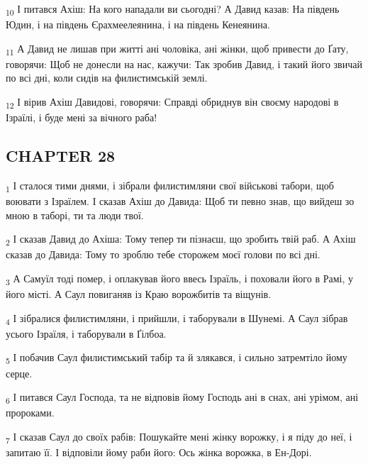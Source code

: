 \begin{tcolorbox}
\textsubscript{10} І питався Ахіш: На кого нападали ви сьогодні? А Давид казав: На південь Юдин, і на південь Єрахмеелеянина, і на південь Кенеянина.
\end{tcolorbox}
\begin{tcolorbox}
\textsubscript{11} А Давид не лишав при житті ані чоловіка, ані жінки, щоб привести до Ґату, говорячи: Щоб не донесли на нас, кажучи: Так зробив Давид, і такий його звичай по всі дні, коли сидів на филистимській землі.
\end{tcolorbox}
\begin{tcolorbox}
\textsubscript{12} І вірив Ахіш Давидові, говорячи: Справді обриднув він своєму народові в Ізраїлі, і буде мені за вічного раба!
\end{tcolorbox}
\subsection{CHAPTER 28}
\begin{tcolorbox}
\textsubscript{1} І сталося тими днями, і зібрали филистимляни свої військові табори, щоб воювати з Ізраїлем. І сказав Ахіш до Давида: Щоб ти певно знав, що вийдеш зо мною в таборі, ти та люди твої.
\end{tcolorbox}
\begin{tcolorbox}
\textsubscript{2} І сказав Давид до Ахіша: Тому тепер ти пізнаєш, що зробить твій раб. А Ахіш сказав до Давида: Тому то зроблю тебе сторожем моєї голови по всі дні.
\end{tcolorbox}
\begin{tcolorbox}
\textsubscript{3} А Самуїл тоді помер, і оплакував його ввесь Ізраїль, і поховали його в Рамі, у його місті. А Саул повиганяв із Краю ворожбитів та віщунів.
\end{tcolorbox}
\begin{tcolorbox}
\textsubscript{4} І зібралися филистимляни, і прийшли, і таборували в Шунемі. А Саул зібрав усього Ізраїля, і таборували в Ґілбоа.
\end{tcolorbox}
\begin{tcolorbox}
\textsubscript{5} І побачив Саул филистимський табір та й злякався, і сильно затремтіло йому серце.
\end{tcolorbox}
\begin{tcolorbox}
\textsubscript{6} І питався Саул Господа, та не відповів йому Господь ані в снах, ані урімом, ані пророками.
\end{tcolorbox}
\begin{tcolorbox}
\textsubscript{7} І сказав Саул до своїх рабів: Пошукайте мені жінку ворожку, і я піду до неї, і запитаю її. І відповіли йому раби його: Ось жінка ворожка, в Ен-Дорі.
\end{tcolorbox}
